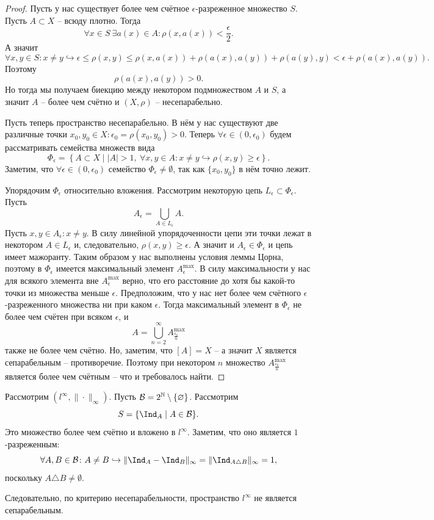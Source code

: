\begin{proof}
    Пусть у нас существует более чем счётное $\epsilon$-разреженное множество $S$.
    Пусть $A \subset X$ -- всюду плотно.
    Тогда
    \[
        \forall x \in S \ \exists a(x) \in A\colon \rho(x, a(x)) < \frac{\epsilon}{2}.
    \]
    А значит
    \[
        \forall x, y \in S\colon x \neq y \hookrightarrow \epsilon \leq \rho(x, y) \leq \rho(x, a(x)) + \rho(a(x), a(y)) + \rho(a(y), y) < \epsilon + \rho(a(x), a(y)).
    \]
    Поэтому
    \[
        \rho(a(x), a(y)) > 0.
    \]
    Но тогда мы получаем биекцию между некотором подмножеством $A$ и $S$, а значит $A$ -- более чем счётно и $(X, \rho)$ -- несепарабельно.

    Пусть теперь пространство несепарабельно.
    В нём у нас существуют две различные точки $x_0, y_0 \in X\colon \epsilon_0 = \rho(x_0, y_0) > 0$.
    Теперь $\forall \epsilon \in (0, \epsilon_0)$ будем рассматривать семейства множеств вида
    \[
        \Phi_{\epsilon} = \left\{ A \subset X \mid |A| > 1, \ \forall x, y \in A\colon x \neq y \hookrightarrow \rho(x, y) \geq \epsilon \right\}.
    \]
    Заметим, что $\forall \epsilon \in (0, \epsilon_0)$ семейство $\Phi_\epsilon \neq \emptyset$, так как $\{x_0, y_0\}$ в нём точно лежит.

    Упорядочим $\Phi_\epsilon$ относительно вложения.
    Рассмотрим некоторую цепь $L_\epsilon \subset \Phi_\epsilon$.
    Пусть
    \[
        A_\epsilon = \bigcup_{A \in L_\epsilon} A.
    \]
    Пусть $x, y \in A_\epsilon\colon x \neq y$.
    В силу линейной упорядоченности цепи эти точки лежат в некотором $A \in L_\epsilon$ и, следовательно, $\rho(x, y) \geq \epsilon$.
    А значит и $A_\epsilon \in \Phi_\epsilon$ и цепь имеет мажоранту.
    Таким образом у нас выполнены условия леммы Цорна, поэтому в $\Phi_\epsilon$ имеется максимальный элемент $A_{\epsilon}^{\max}$.
    В силу максимальности у нас для всякого элемента вне $A^{\max}_{\epsilon}$ верно, что его расстояние до хотя бы какой-то точки из множества меньше $\epsilon$.
    Предположим, что у нас нет более чем счётного $\epsilon$-разреженного множества ни при каком $\epsilon$.
    Тогда максимальный элемент в $\Phi_\epsilon$ не более чем счётен при всяком $\epsilon$, и
    \[
        A = \bigcup_{n = 2}^{\infty} A^{\max}_{\frac{\epsilon_0}{n}}
    \]
    также не более чем счётно.
    Но, заметим, что $[A] = X$ -- а значит $X$ является сепарабельным -- противоречие.
    Поэтому при некотором $n$ множество $A^{\max}_{\frac{\epsilon_0}{n}}$ является более чем счётным -- что и требовалось найти.
\end{proof}
\begin{example}
    Рассмотрим $(l^\infty, \|\cdot\|_\infty)$.
    Пусть $\mathcal{B} = 2^{\mathbb{N}} \setminus \{\varnothing\}$.
    Рассмотрим
    \[
        S = \{\Ind_{A} \mid A \in \mathcal{B}\}.
    \]
    Это множество более чем счётно и вложено в $l^\infty$.
    Заметим, что оно является $1$-разреженным:
    \[
        \forall A, B \in \mathcal{B}\colon A \neq B \hookrightarrow \|\Ind_A - \Ind_B\|_{\infty} = \|\Ind_{A \triangle B}\|_{\infty} = 1,
    \]
    поскольку $A \triangle B \neq \emptyset$.

    Следовательно, по критерию несепарабельности, пространство $l^\infty$ не является сепарабельным.
\end{example}
